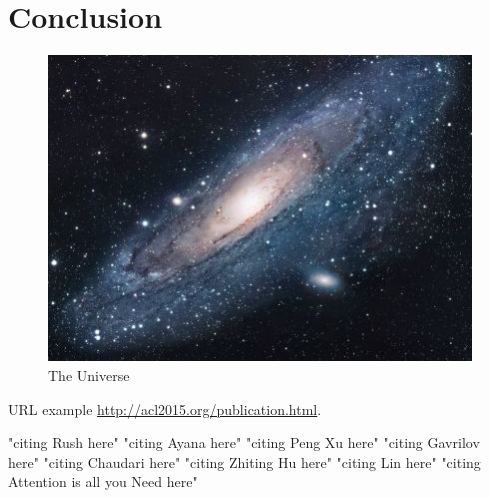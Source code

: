 \documentclass[11pt]{article}
\begin{document}
\section{Conclusion}

\begin{figure}[h!]
\centering
\includegraphics[scale=1.7]{universe}
\caption{The Universe}
\label{fig:universe}
\end{figure}

URL example
\url{http://acl2015.org/publication.html}.

"citing Rush here" \citep{rush2015neural}
"citing Ayana here" \cite{Ayana2017}
"citing Peng Xu here" \cite{DBLP:journals/corr/abs-1902-07110}
"citing Gavrilov here" \cite{DBLP:journals/corr/abs-1901-07786}
"citing Chaudari here" \cite{DBLP:journals/corr/abs-1802-09426}
"citing Zhiting Hu here" \cite{DBLP:journals/corr/HuYLSX17}
"citing Lin here" \cite{lin-2004-rouge}
"citing Attention is all you Need here" \cite{DBLP:journals/corr/VaswaniSPUJGKP17}



\end{document}
